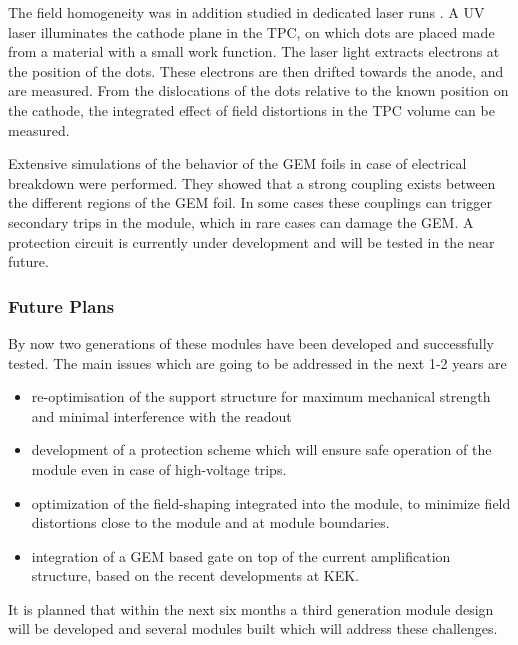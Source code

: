 The field homogeneity was in addition studied in dedicated laser runs \cite{ZenkerPhD}. A UV laser illuminates the cathode plane in the TPC, on which dots are placed made from a material with a small work function. The laser light extracts electrons at the position of the dots. These electrons are then drifted towards the anode, and are measured. From the dislocations of the dots relative to the known position on the cathode, the integrated effect of field distortions in the TPC volume can be measured.

Extensive simulations of the behavior of the GEM foils in case of electrical breakdown were performed. They showed that a strong coupling exists between the different regions of the GEM foil. In some cases these couplings can trigger secondary trips in the module, which in rare cases can damage the GEM. A protection circuit is currently under development and will be tested in the near future.

\subsubsection{Future Plans}

By now two generations of these modules have been developed and successfully tested. The main issues which are going to be addressed in the next 1-2 years are
\begin{itemize}
\item re-optimisation of the support structure for maximum mechanical strength and minimal interference with the readout
\item development of a protection scheme which will ensure safe operation of the module even in case of high-voltage trips.
\item optimization of the field-shaping integrated into the module, to minimize field distortions close to the module and at module boundaries.
\item integration of a GEM based gate on top of the current amplification structure, based on the recent developments at KEK.
\end{itemize}
It is planned that within the next six months a third generation module design will be developed and several modules built which will address these challenges.

